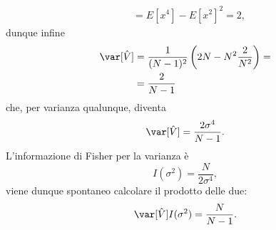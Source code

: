 \begin{solution}
\begin{align*}
		&= E[x^4] - E[x^2]^2
		= 2,
	\end{align*}
	dunque infine
	\begin{align*}
		\var[\hat V]
		&= \frac1{(N-1)^2} \left( 2N - N^2 \frac2{N^2} \right) = \\
		&= \frac2{N-1}
	\end{align*}
	che, per varianza qualunque, diventa
	\begin{equation*}
		\var[\hat V]
		= \frac{2\sigma^4}{N-1}.
	\end{equation*}
	L'informazione di Fisher per la varianza è
	\begin{equation*}
		I(\sigma^2)
		= \frac N{2\sigma^4},
	\end{equation*}
	viene dunque spontaneo calcolare il prodotto delle due:
	\begin{equation*}
		\var[\hat V]I(\sigma^2)
		= \frac N{N-1}.
	\end{equation*}
\end{solution}
